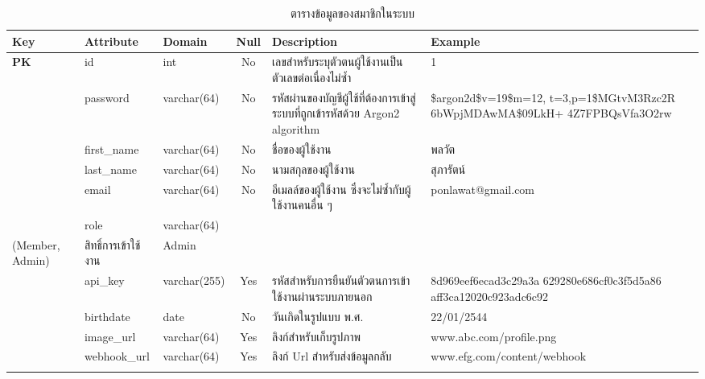 \documentclass[12pt,oneside,openright,a4paper]{cpe-thai-project}
\begin{document}
\begin{longtable}{p{}|p{}|p{}|m{}|p{}|p{}}
  \caption{ตารางข้อมูลของสมาชิกในระบบ}\label{tbl:users}  \\
  \hhline{======} 
  \textbf{Key} & \textbf{Attribute} & \textbf{Domain} & \multicolumn{1}{c|}{\textbf{Null}} & \textbf{Description} & \textbf{Example}   \\ \hline
  \endhead
  \textbf{PK}  & id  & int  & \multicolumn{1}{c|}{No}  & เลขสำหรับระบุตัวตนผู้ใช้งานเป็นตัวเลขต่อเนื่องไม่ซ้ำ & 1                  \\ \hline
  \textbf{} & password & varchar(64) & \multicolumn{1}{c|}{No} & รหัสผ่านของบัญชีผู้ใช้ที่ต้องการเข้าสู่ระบบที่ถูกเข้ารหัสด้วย Argon2 algorithm & \$argon2d\$v=19\$m=12, t=3,p=1\$MGtvM3Rzc2R 6bWpjMDAwMA\$09LkH+ 4Z7FPBQsVfa3O2rw \\ \hline
  \textbf{}   & first\_name        & varchar(64)     & \multicolumn{1}{c|}{No}                  & ชื่อของผู้ใช้งาน                                      & พลวัต              \\ \hline
  \textbf{}   & last\_name         & varchar(64)     & \multicolumn{1}{c|}{No}                  & นามสกุลของผู้ใช้งาน                                   & สุภารัตน์          \\ \hline
  \textbf{}   & email              & varchar(64)     & \multicolumn{1}{c|}{No}                  & อีเมลล์ของผู้ใช้งาน ซึ่งจะไม่ซ้ำกับผู้ใช้งานคนอื่น ๆ  & ponlawat@gmail.com \\ \hline
  \textbf{}   & role               & varchar(64)     & \begin{tabular}[c]{@{}c@{}} ENUM \\ (Member, Admin) \end{tabular} & สิทธิ์การเข้าใช้งาน                                   & Admin              \\ \hline
  \textbf{}   & api\_key & varchar(255) & \multicolumn{1}{c|}{Yes} &  รหัสสำหรับการยืนยันตัวตนการเข้าใช้งานผ่านระบบภายนอก & 8d969eef6ecad3c29a3a 629280e686cf0c3f5d5a86 aff3ca12020c923adc6c92 \\ \hline
  \textbf{}   & birthdate        & date     & \multicolumn{1}{c|}{No}                  & วันเกิดในรูปแบบ พ.ศ.                                      & 22/01/2544              \\ \hline
  \textbf{}   & image\_url        & varchar(64)     & \multicolumn{1}{c|}{Yes}          & ลิงก์สำหรับเก็บรูปภาพ                                     & www.abc.com/profile.png              \\ \hline
  \textbf{}   & webhook\_url        & varchar(64)     & \multicolumn{1}{c|}{Yes}          & ลิงก์ Url สำหรับส่งข้อมูลกลับ                           & www.efg.com/content/webhook            \\
  \hhline{======}  
\end{longtable}
\end{document}

